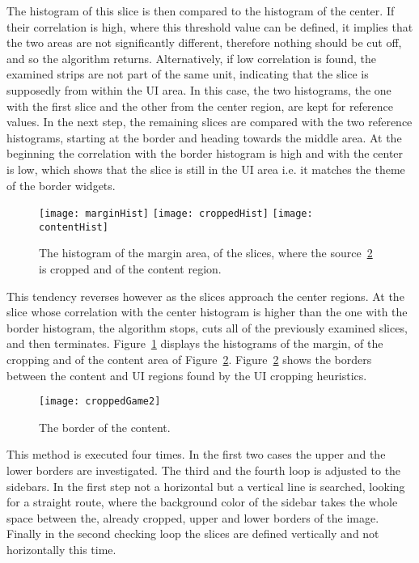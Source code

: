 \documentclass[draft,final]{vutinfth} %
\begin{document}
	The histogram of this slice is then compared to the histogram of the center.
	If their correlation is high, where this threshold value can be defined, it implies that the two areas are not significantly different, therefore nothing should be cut off, and so the algorithm returns.
	Alternatively, if low correlation is found, the examined strips are not part of the same unit, indicating that the slice is supposedly from within the UI area.
	In this case, the two histograms, the one with the first slice and the other from the center region, are kept for reference values.
	In the next step, the remaining slices are compared with the two reference histograms, starting at the border and heading towards the middle area.
	At the beginning the correlation with the border histogram is high and with the center is low, which shows that the slice is still in the UI area i.e. it matches the theme of the border widgets.
	\begin{figure}[H]
		\texttt{[image: marginHist]}\hfill
		\texttt{[image: croppedHist]}\hfill
		\texttt{[image: contentHist]}
		\caption{The histogram of the margin area, of the slices, where the source~\ref{fig:cropped} is cropped and of the content region.}
		\label{fig:hist}
	\end{figure}
	This tendency reverses however as the slices approach the center regions.
	At the slice whose correlation with the center histogram is higher than the one with the border histogram, the algorithm stops, cuts all of the previously examined slices, and then terminates.
	Figure~\ref{fig:hist} displays the histograms of the margin, of the cropping and of the content area of Figure~\ref{fig:cropped}.
	Figure~\ref{fig:cropped} shows the borders between the content and UI regions found by the UI cropping heuristics.\par 
	\begin{figure}[H]
		\centering		
		\texttt{[image: croppedGame2]}
		\caption{The border of the content.}
		\label{fig:cropped}
	\end{figure}

	This method is executed four times.
	In the first two cases the upper and the lower borders are investigated.
	The third and the fourth loop is adjusted to the sidebars.
	In the first step not a horizontal but a vertical line is searched, looking for a straight route, where the background color of the sidebar takes the whole space between the, already cropped, upper and lower borders of the image.
	Finally in the second checking loop the slices are defined vertically and not horizontally this time. 
	
\end{document}
